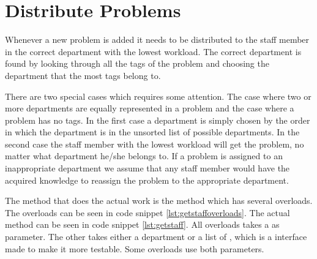 \section{Distribute Problems}
\label{sec:dispro}
Whenever a new problem is added it needs to be distributed to the staff member in the correct department with the lowest workload. 
The correct department is found by looking through all the tags of the problem and choosing the department that the most tags belong to.

There are two special cases which requires some attention. 
The case where two or more departments are equally represented in a problem and the case where a problem has no tags. 
In the first case a department is simply chosen by the order in which the department is in the unsorted list of possible departments. 
In the second case the staff member with the lowest workload will get the problem, no matter what department he/she belongs to.
If a problem is assigned to an inappropriate department we assume that any staff member would have the acquired knowledge to reassign the problem to the appropriate department. 

The method that does the actual work is the  method which has several overloads. The overloads can be seen in code snippet \ref{lst:getstaffoverloads}. The actual method can be seen in code snippet \ref{lst:getstaff}. 
All overloads takes a  as parameter. 
The other takes either a department or a list of , which is a  interface made to make it more testable. 
Some overloads use both parameters.


